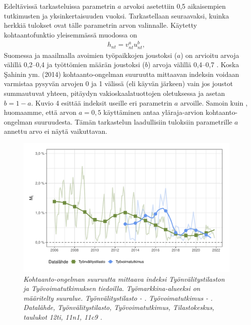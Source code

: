 \documentclass[12pt]{article}
\newcommand{\lastdatamonth}{\unskip}
\newcommand{\firstdatamonth}{\unskip}
\newcommand{\lastdataquarter}{\unskip}
\newcommand{\firstdataquarter}{\unskip}
\newcommand{\newcaption}[1]{\caption{\textit{\footnotesize{#1}}}}
\begin{document}
Edeltävissä tarkasteluissa parametrin $a$ arvoksi asetettiin 0,5 aikaisempien tutkimusten ja yksinkertaisuuden vuoksi. Tarkastellaan seuraavaksi, kuinka herkkiä tulokset ovat tälle parametrin arvon valinnalle. Käytetty kohtaantofunktio yleisemmässä muodossa on 
\begin{align}
h_{nt}=v_{nt}^au_{nt}^b,
\end{align}
Suomessa ja maailmalla avoimien työpaikkojen joustoksi ($a$) on arvioitu arvoja välillä 0,2–0,4 ja työttömien määrän joustoksi ($b$) arvoja välillä 0,4–0,7 \cite{lahtonen2006matching, petrongolo2001looking}. Koska Şahinin ym. (2014) kohtaanto-ongelman suuruutta mittaavan indeksin voidaan varmistaa pysyvän arvojen 0 ja 1 välissä (eli käyvän järkeen) vain jos joustot summautuvat yhteen, pitäydyn vakioskaalatuottojen oletuksessa ja asetan $b = 1-a$. Kuvio 4 esittää indeksit useille eri parametrin $a$ arvoille. Samoin kuin , huomaamme, että arvon $a = 0,5$ käyttäminen antaa yläraja-arvion kohtaanto-ongelman suuruudesta. Tämän tarkastelun laadullisiin tuloksiin parametrille $a$ annettu arvo ei näytä vaikuttavan. 

\begin{figure}
\centering
\includegraphics[scale = 0.8]{../kuviot/indeksi_suuralueittain.pdf}
    \newcaption{Kohtaanto-ongelman suuruutta mittaava indeksi Työnvälitystilaston ja Työvoimatutkimuksen tiedoilla. Työmarkkina-alueeksi on määritelty suuralue.  Työnvälitystilasto \protect \firstdatamonth \phantom{}  - \protect\lastdatamonth. Työvoimatutkimus \protect \firstdataquarter \phantom{} - \protect\lastdataquarter. Datalähde, Työnvälitystilasto, Työvoimatutkimus, Tilastokeskus, taulukot 12ti, 11n1, 11c9  \protect \cite{svt2011}.}
   \label{fig:ld0923g}
\end{figure}
\end{document}
